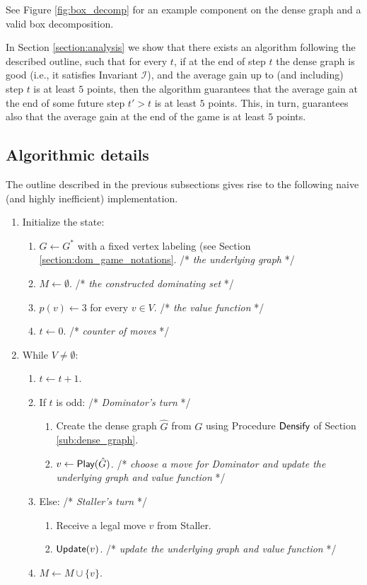 \documentclass[11pt]{article}
\def\dnsitem{\vspace{-7pt}\item}
\def\dnssubitem{\vspace{-5pt}\item}
\theoremstyle{definition}
\def\invboxes{\mathcal{I}}
\def\performmatch{\mbox{\sf Perform\_Match}}
\def\play{\mbox{\sf Play}}
\def\update{\mbox{\sf Update}}
\def\densify{\mbox{\sf Densify}}
\begin{document}
See Figure \ref{fig:box_decomp} for an example component on the dense graph and a valid box decomposition.

In Section \ref{section:analysis} we show that there exists an algorithm following the described outline, such that for every $t$, if at the end of step $t$ the dense graph is good (i.e., it satisfies Invariant $\invboxes$), and the average gain up to (and including) step $t$ is at least $5$ points, then the algorithm guarantees that the average gain at the end of 
some future step $t' > t$ 
is at least $5$ points.
This, in turn, guarantees also that the average gain at the end of the game is at least $5$ points.


\subsection{Algorithmic details}
\label{sub:algorithmic_details}
The outline described in the previous subsections gives rise to the following naive (and highly inefficient) implementation.

\smallskip
\par\noindent{\bf Procedure $\performmatch(G^*(V^*, E^*))$:}
\begin{enumerate}
	\dnsitem Initialize the state:
	\begin{enumerate}
		\dnsitem $G \leftarrow G^*$ with a fixed vertex labeling (see Section \ref{section:dom_game_notations}.
/*  \textit{the underlying graph} */
		\dnssubitem $M \leftarrow \emptyset$. /* \textit{the constructed dominating set} */
		\dnssubitem $p(v) \leftarrow 3$ for every $v \in V$. /* \textit{the value function} */
		\dnssubitem $t \leftarrow 0$. /* \textit{counter of moves} */
	\end{enumerate}
	
	\dnsitem While $V \neq \emptyset$:
	\begin{enumerate}
		\dnsitem $t \leftarrow t + 1$.
		
		\dnssubitem If $t$ is odd: /* \textit{Dominator's turn} */
		\begin{enumerate}
			\dnsitem Create the dense graph $\hat{G}$ from $G$ using Procedure $\densify$ of Section \ref{sub:dense_graph}.
			\dnsitem $v \leftarrow \play(\hat{G})$. /* \textit{choose a move for Dominator and update the underlying graph and value function} */ 
		\end{enumerate}
		
		\dnssubitem Else: /* \textit{Staller's turn} */
		\begin{enumerate}
			\dnsitem Receive a legal move $v$ from Staller.
			\dnsitem $\update(v)$. /* \textit{update the underlying graph and value function} */
		\end{enumerate}
		\dnssubitem $M \leftarrow M \cup \{v\}$.
	\end{enumerate}
\end{enumerate}
\end{document}

